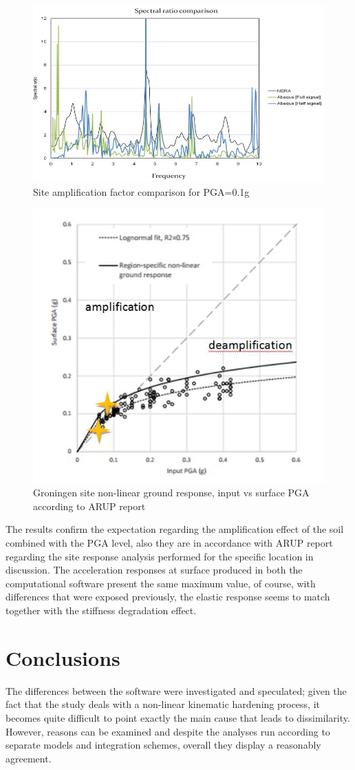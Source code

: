 \documentclass[10pt,a4paper]{report}
\begin{document}
\begin{figure}[h!]
	\centering
	\includegraphics[width=0.7\linewidth]{"spectral2"}
	\caption{Site amplification factor comparison for PGA=0.1g}
	\label{SAF}
\end{figure}
\begin{figure}[h!]
	\centering
	\includegraphics[width=0.7\linewidth]{"ARUP"}
	\caption{Groningen site non-linear ground response, input vs surface PGA according to ARUP report}
	\label{ARUP}
\end{figure}

The results confirm the expectation regarding the amplification effect of the soil combined with the PGA level, also they are in accordance with ARUP report regarding the site response analysis performed for the specific location in discussion. The acceleration responses at surface produced in both the computational software present the same maximum value, of course, with differences that were exposed previously, the elastic response seems to match together with the stiffness degradation effect. 

\section{Conclusions}
The differences between the software were investigated and speculated; given the fact that the study deals with a non-linear kinematic hardening process, it becomes quite difficult to point exactly the main cause that leads to dissimilarity. However, reasons can be examined and despite the analyses run according to separate models and integration schemes, overall they display a reasonably agreement.
\end{document}
